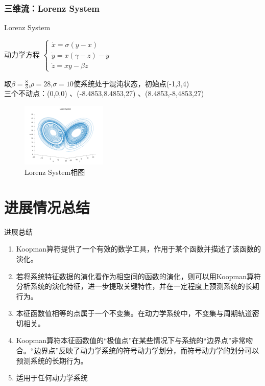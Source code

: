 \documentclass{beamer}
\begin{document}
		\subsubsection{三维流：Lorenz System}
		\begin{frame}{Lorenz System}
		\begin{block}{动力学方程}
			\centering
			\begin{math}
			\begin{cases}
			\dot{x}=\sigma (y-x)\\
			\dot{y}=x(\gamma-z)-y\\
			\dot{z}=xy-\beta z
			\end{cases}\
			\end{math}
		\end{block}
		取$\beta=\frac{8}{3}$,$\rho=28$,$\sigma=10$使系统处于混沌状态，初始点(-1,3,4)\\
		三个不动点：(0,0,0)
、(-8.4853,8.4853,27)
、(8.4853,-8,4853,27)
		\begin{figure}
			\begin{minipage}{0.4\linewidth}
				\centering
				\includegraphics[width=1.6in]{figure/lorenz_phase}
				\caption{Lorenz System相图}
			\end{minipage}
		\end{figure}
		\end{frame}
\section{进展情况总结}
\begin{frame}{进展总结}
\begin{enumerate}
	\item Koopman算符提供了一个有效的数学工具，作用于某个函数并描述了该函数的演化。
	\item 若将系统特征数据的演化看作为相空间的函数的演化，则可以用Koopman算符分析系统的演化特征，进一步提取关键特性，并在一定程度上预测系统的长期行为。
	\item 本征函数值相等的点属于一个不变集。在动力学系统中，不变集与周期轨道密切相关。
	\item Koopman算符本征函数值的“极值点”在某些情况下与系统的“边界点”非常吻合。“边界点”反映了动力学系统的符号动力学划分，而符号动力学的划分可以预测系统的长期行为。
	\item 适用于任何动力学系统
\end{enumerate}
\end{frame}
\end{document}
